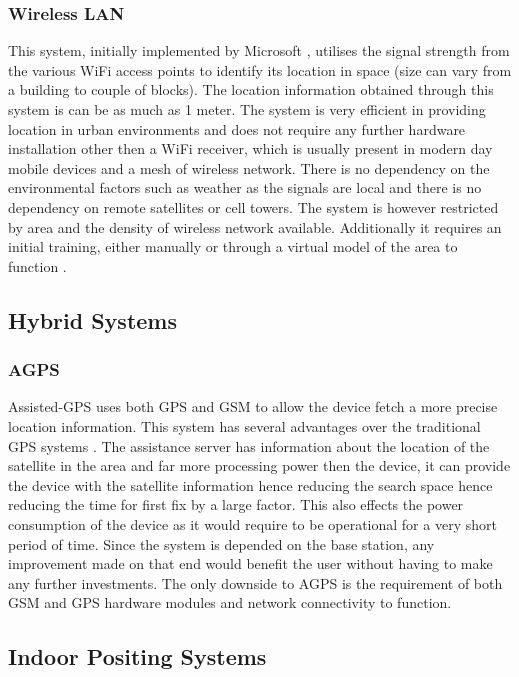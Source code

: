 \documentclass[12pt]{report}
\begin{document}
\subsubsection{Wireless LAN}
This system, initially implemented by Microsoft \cite{bahl1999user}, utilises the signal strength from the various WiFi access points to identify its location in space (size can vary from a building to couple of blocks). The location information obtained through this system is can be as much as 1 meter. The system is very efficient in providing location in urban environments and does not require any further hardware installation other then a WiFi receiver, which is usually present in modern day mobile devices and a mesh of wireless network. There is no dependency on the environmental factors such as weather as the signals are local and there is no dependency on remote satellites or cell towers. The system is however restricted by area and the density of wireless network available. Additionally it requires an initial training, either manually or through a virtual model of the area to function \cite{schiller2004location}.

\subsection{Hybrid Systems}

\subsubsection{AGPS}
Assisted-GPS uses both GPS and GSM to allow the device fetch a more precise location information. This system has several advantages over the traditional GPS systems \cite{djuknic2001geolocation}. The assistance server has information about the location of the satellite in the area and far more processing power then the device, it can provide the device with the satellite information hence reducing the search space hence reducing the time for first fix by a large factor. This also effects the power consumption of the device as it would require to be operational for a very short period of time. Since the system is depended on the base station, any improvement made on that end would benefit the user without having to make any further investments. The only downside to AGPS is the requirement of both GSM and GPS hardware modules and network connectivity to function.

\subsection{Indoor Positing Systems}
\end{document}
